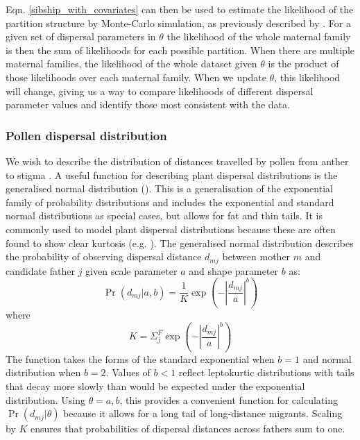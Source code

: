 \documentclass[10pt, a4paper, twocolumn]{article} %
\begin{document}
Eqn. \ref{sibship_with_covariates} can then be used to estimate the likelihood of the partition structure by Monte-Carlo simulation, as previously described by \textcite{ellis2018efficient}.
For a given set of dispersal parameters in $\theta$ the likelihood of the whole maternal family is then the sum of likelihoods for each possible partition. When there are multiple maternal families, the likelihood of the whole dataset given $\theta$ is the product of those likelihoods over each maternal family. When we update $\theta$, this likelihood will change, giving us a way to compare likelihoods of different dispersal parameter values and identify those most consistent with the data.

\subsubsection{Pollen dispersal distribution}

We wish to describe the distribution of distances travelled by pollen from anther to stigma \citep{nathan2012dispersal}.
A useful function for describing plant dispersal distributions is the generalised normal distribution (\cite{clark1998trees,Nadarajah2005,kremer2012long}). This is a generalisation of the exponential family of probability distributions and includes the exponential and standard normal distributions as special cases, but allows for fat and thin tails. It is commonly used to model plant dispersal distributions because these are often found to show clear kurtosis (e.g. \cite{austerlitz2004using, robledo2005patterns, klein2008pollen, burczyk2019patterns, field2011importance, ottewell2012pollen}). The generalised normal distribution describes the probability of observing dispersal distance $d_{mj}$ between mother $m$ and candidate father $j$ given scale parameter $a$ and shape parameter $b$ as:
\begin{equation}
    \Pr(d_{mj}|a,b) = \frac{1}{K} \exp{  (-|\frac{d_{mj}}{a}| ^b) }
    \label{eqn:GND}
\end{equation}
where
\begin{equation}
    K = \Sigma_j^F \exp  (-|\frac{d_{mj}}{a}| ^b) 
\end{equation}
The function takes the forms of the standard exponential when $b=1$ and normal distribution when $b=2$. Values of $b<1$ reflect leptokurtic distributions with tails that decay more slowly than would be expected under the exponential distribution. Using $\theta={a,b}$, this provides a convenient function for calculating $\Pr(d_{mj} | \theta)$ because it allows for a long tail of long-distance migrants.
Scaling by $K$ ensures that probabilities of dispersal distances across fathers sum to one.
\end{document}
